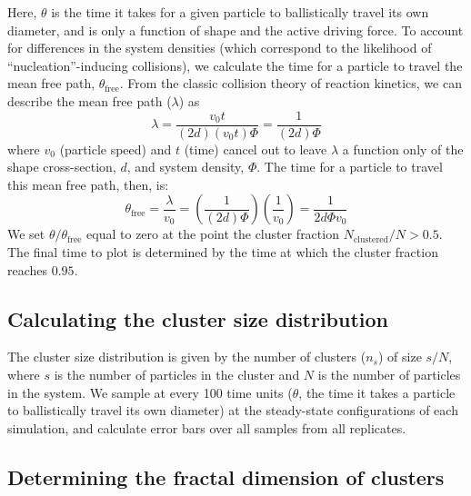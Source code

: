 Here, $\theta$ is the time it takes for a given particle to ballistically travel its own diameter, and is only a function of shape and the active driving force.
To account for differences in the system densities (which correspond to the likelihood of ``nucleation''-inducing collisions), we calculate the time for a particle to travel the mean free path, $\theta_\text{free}$.
From the classic collision theory of reaction kinetics, we can describe the mean free path ($\lambda$) as
\begin{equation}
\lambda = \frac{v_0t}{(2d)(v_0t)\Phi} = \frac{1}{(2d)\Phi}
\end{equation}
where $v_0$ (particle speed) and $t$ (time) cancel out to leave $\lambda$ a function only of the shape cross-section, $d$, and system density, $\Phi$.
The time for a particle to travel this mean free path, then, is:
\begin{equation}
\theta_\text{free} = \frac{\lambda}{v_0} = \left(\frac{1}{(2d)\Phi}\right)\left(\frac{1}{v_0}\right) = \frac{1}{2d\Phi{v_0}}
\end{equation}
We set $\theta/\theta_\text{free}$ equal to zero at the point the cluster fraction $N_\text{clustered}/N>0.5$.
The final time to plot is determined by the time at which the cluster fraction reaches $0.95$.

\subsection{Calculating the cluster size distribution}
\label{sec:CSD}

The cluster size distribution is given by the number of clusters ($n_s$) of size $s/N$, where $s$ is the number of particles in the cluster and $N$ is the number of particles in the system.
We sample at every 100 time units ($\theta$, the time it takes a particle to ballistically travel its own diameter) at the steady-state configurations of each simulation, and calculate error bars over all samples from all replicates.

\subsection{Determining the fractal dimension of clusters}

